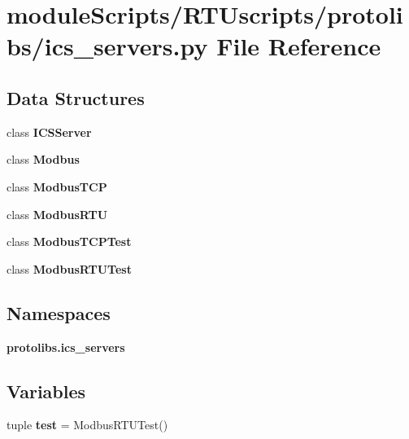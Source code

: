\section{module\+Scripts/\+R\+T\+Uscripts/protolibs/ics\+\_\+servers.py File Reference}
\label{ics__servers_8py}
\subsection*{Data Structures}
\begin{DoxyCompactItemize}
\item 
class {\bf I\+C\+S\+Server}
\item 
class {\bf Modbus}
\item 
class {\bf Modbus\+T\+C\+P}
\item 
class {\bf Modbus\+R\+T\+U}
\item 
class {\bf Modbus\+T\+C\+P\+Test}
\item 
class {\bf Modbus\+R\+T\+U\+Test}
\end{DoxyCompactItemize}
\subsection*{Namespaces}
\begin{DoxyCompactItemize}
\item 
 {\bf protolibs.\+ics\+\_\+servers}
\end{DoxyCompactItemize}
\subsection*{Variables}
\begin{DoxyCompactItemize}
\item 
tuple {\bf test} = Modbus\+R\+T\+U\+Test()
\end{DoxyCompactItemize}
